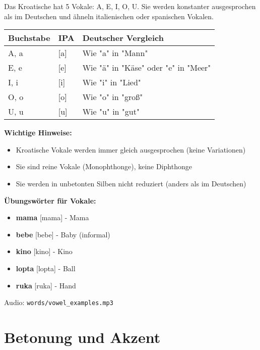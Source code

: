 Das Kroatische hat 5 Vokale: A, E, I, O, U. Sie werden konstanter ausgesprochen als im Deutschen und ähneln italienischen oder spanischen Vokalen.

\begin{tcolorbox}[breakable, colback=lightgreen!30, colframe=green!60!black, title=\textbf{Kroatische Vokale}]

\begin{center}
\begin{tabular}{lll}
\toprule
\textbf{Buchstabe} & \textbf{IPA} & \textbf{Deutscher Vergleich} \\
\midrule
A, a & [a] & Wie "a" in "Mann" \\
E, e & [e] & Wie "ä" in "Käse" oder "e" in "Meer" \\
I, i & [i] & Wie "i" in "Lied" \\
O, o & [o] & Wie "o" in "groß" \\
U, u & [u] & Wie "u" in "gut" \\
\bottomrule
\end{tabular}
\end{center}

\textbf{Wichtige Hinweise:}
\begin{itemize}
    \item Kroatische Vokale werden immer gleich ausgesprochen (keine Variationen)
    \item Sie sind reine Vokale (Monophthonge), keine Diphthonge
    \item Sie werden in unbetonten Silben nicht reduziert (anders als im Deutschen)
\end{itemize}

\textbf{Übungswörter für Vokale:}
\begin{itemize}
    \item \textbf{mama} [mama] - Mama
    \item \textbf{bebe} [bebe] - Baby (informal)
    \item \textbf{kino} [kino] - Kino
    \item \textbf{lopta} [lopta] - Ball
    \item \textbf{ruka} [ruka] - Hand
\end{itemize}

Audio: \small\texttt{words/vowel\_examples.mp3}

\end{tcolorbox}

\section{Betonung und Akzent}

